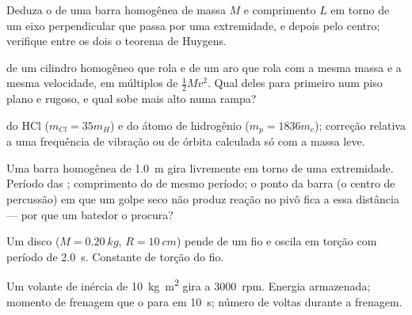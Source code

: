 \begin{exercise}[$\star$]\label{exo:b1:systems-of-points:4}
Deduza o  de uma barra homogênea de massa $M$ e
comprimento $L$ em torno de um eixo perpendicular que passa por uma
extremidade, e depois pelo centro; verifique entre os dois o teorema de Huygens.
\end{exercise}

\begin{exercise}[$\star\star$]\label{exo:b1:systems-of-points:5}
 de um cilindro homogêneo que rola e de um aro que rola com
a mesma massa e a mesma velocidade, em múltiplos de $\tfrac12 Mv^2$. Qual
deles para primeiro num piso plano e rugoso, e qual sobe mais alto numa rampa?
\end{exercise}

\begin{exercise}[$\star\star$]\label{exo:b1:systems-of-points:6}
 do HCl ($m_{Cl} = 35m_H$) e do átomo de hidrogênio
($m_p = 1836m_e$); correção relativa a uma frequência de vibração ou de
órbita calculada só com a massa leve.
\end{exercise}

\begin{exercise}[$\star\star$]\label{exo:b1:systems-of-points:7}
Uma barra homogênea de \qty{1.0}{m} gira livremente em torno de uma
extremidade. Período das ; comprimento do  de mesmo período; o ponto da barra (o centro de percussão) em que
um golpe seco não produz reação no pivô fica a essa distância --- por que
um batedor o procura?
\end{exercise}

\begin{exercise}[$\star\star$]\label{exo:b1:systems-of-points:8}
Um disco ($M = \qty{0.20}{kg}$, $R = \qty{10}{cm}$) pende de um fio e
oscila em torção com período de \qty{2.0}{s}. Constante de torção do
fio.
\end{exercise}

\begin{exercise}[$\star\star$]\label{exo:b1:systems-of-points:9}
Um volante de inércia de  \qty{10}{kg.m^2} gira a \qty{3000}{rpm}.
Energia armazenada; momento de frenagem que o para em \qty{10}{s}; número de
voltas durante a frenagem.
\end{exercise}

